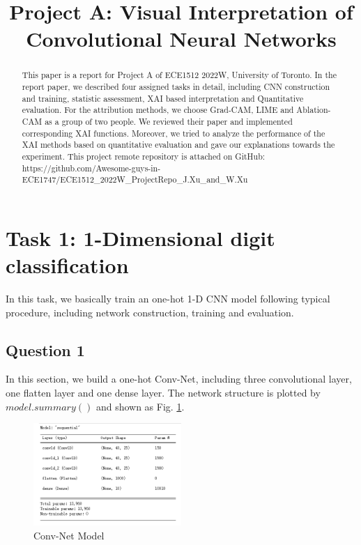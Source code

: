 \documentclass[conference]{IEEEtran}
\begin{document}
\title{Project A: Visual Interpretation of Convolutional Neural Networks}
	\maketitle
	
	\begin{abstract}
		This paper is a report for Project A of ECE1512 2022W, University of Toronto. In the report paper, we described four assigned tasks in detail, including CNN construction and training, statistic assessment, XAI based interpretation and Quantitative evaluation. For the attribution methods, we choose Grad-CAM, LIME and Ablation-CAM as a group of two people. We reviewed their paper and implemented corresponding XAI functions. Moreover, we tried to analyze the performance of the XAI methods based on quantitative evaluation and gave our explanations towards the experiment. This project remote repository is attached on GitHub: https://github.com/Awesome-guys-in-ECE1747/ECE1512\_2022W\_ProjectRepo\_J.Xu\_and\_W.Xu
	\end{abstract}

	\section{Task 1: 1-Dimensional digit classification}
	
	In this task, we basically train an one-hot 1-D CNN model following typical procedure, including network construction, training and evaluation.
	
	\subsection{Question 1}
	
	In this section, we build a one-hot Conv-Net, including three convolutional layer, one flatten layer and one dense layer.
	The network structure is plotted by $model.summary()$ and shown as Fig. \ref{Fig.t1q1}.
	
	\begin{figure}[h] 
		\centering
		\includegraphics[width=0.5\textwidth]{./graphs/T1Q1.png}
		\caption{Conv-Net Model}
		\label{Fig.t1q1}
	\end{figure}
	
\end{document}
